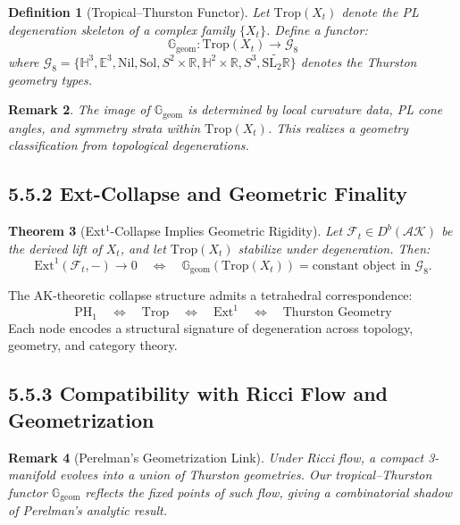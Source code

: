 \documentclass[11pt]{article}
\newtheorem{theorem}{Theorem}[section]
\newtheorem{definition}[theorem]{Definition}
\newtheorem{remark}[theorem]{Remark}
\begin{document}
\begin{definition}[Tropical–Thurston Functor]
Let \( \mathrm{Trop}(X_t) \) denote the PL degeneration skeleton of a complex family \( \{X_t\} \). Define a functor:
\[
\mathbb{G}_\mathrm{geom} : \mathrm{Trop}(X_t) \longrightarrow \mathcal{G}_8
\]
where \( \mathcal{G}_8 = \{ \mathbb{H}^3, \mathbb{E}^3, \text{Nil}, \text{Sol}, S^2 \times \mathbb{R}, \mathbb{H}^2 \times \mathbb{R}, S^3, \widetilde{\text{SL}_2\mathbb{R}} \} \) denotes the Thurston geometry types.
\end{definition}

\begin{remark}
The image of \( \mathbb{G}_\mathrm{geom} \) is determined by local curvature data, PL cone angles, and symmetry strata within \( \mathrm{Trop}(X_t) \). This realizes a geometry classification from topological degenerations.
\end{remark}

\subsection{5.5.2 Ext-Collapse and Geometric Finality}

\begin{theorem}[Ext$^1$-Collapse Implies Geometric Rigidity]
Let \( \mathcal{F}_t \in D^b(\mathcal{AK}) \) be the derived lift of \( X_t \), and let \( \mathrm{Trop}(X_t) \) stabilize under degeneration. Then:
\[
\mathrm{Ext}^1(\mathcal{F}_t, -) \to 0 \quad \Longleftrightarrow \quad \mathbb{G}_\mathrm{geom}(\mathrm{Trop}(X_t)) = \text{constant object in } \mathcal{G}_8.
\]
\end{theorem}

\begin{corollary}
The AK-theoretic collapse structure admits a tetrahedral correspondence:
\[
\mathrm{PH}_1 \quad \Longleftrightarrow \quad \mathrm{Trop} \quad \Longleftrightarrow \quad \mathrm{Ext}^1 \quad \Longleftrightarrow \quad \text{Thurston Geometry}
\]
Each node encodes a structural signature of degeneration across topology, geometry, and category theory.
\end{corollary}

\subsection{5.5.3 Compatibility with Ricci Flow and Geometrization}

\begin{remark}[Perelman's Geometrization Link]
Under Ricci flow, a compact 3-manifold evolves into a union of Thurston geometries. Our tropical–Thurston functor \( \mathbb{G}_\mathrm{geom} \) reflects the fixed points of such flow, giving a combinatorial shadow of Perelman's analytic result.
\end{remark}
\end{document}
